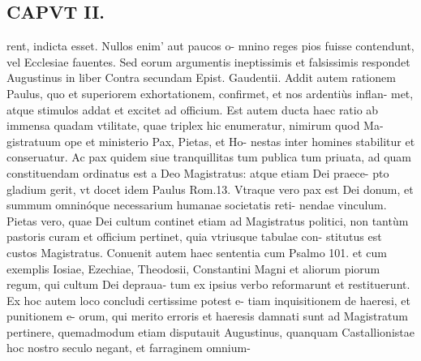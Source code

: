 \documentclass{article}
\begin{document}
\begin{pages}
\section*{CAPVT II. }
\marginpar{[ p.49 ]}\pstart rent, indicta esset. Nullos enim' aut paucos o- mnino reges pios fuisse contendunt, vel Ecclesiae fauentes. Sed eorum argumentis ineptissimis et falsissimis respondet Augustinus in liber  Contra secundam Epist. Gaudentii.  \pend\pstart Addit autem rationem Paulus, quo et superiorem exhortationem, confirmet, et nos ardentiùs inflan- met, atque  stimulos addat et excitet ad officium. Est autem ducta haec ratio ab immensa quadam vtilitate, quae triplex hic enumeratur, nimirum quod Ma- gistratuum ope et ministerio Pax, Pietas, et Ho- nestas inter homines stabilitur et conseruatur.  \pend\pstart Ac pax quidem siue tranquillitas tum publica tum priuata, ad quam constituendam ordinatus est a Deo Magistratus: atque etiam Dei praece- pto gladium gerit, vt docet idem Paulus Rom.13. Vtraque vero pax est Dei donum, et summum omninóque necessarium humanae societatis reti- nendae vinculum.  \pend\pstart Pietas vero, quae Dei cultum continet etiam ad Magistratus politici, non tantùm pastoris curam et officium pertinet, quia vtriusque tabulae con- stitutus est custos Magistratus. Conuenit autem haec sententia cum Psalmo 101. et cum exemplis Iosiae, Ezechiae, Theodosii, Constantini Magni et aliorum piorum regum, qui cultum Dei depraua- tum ex ipsius verbo reformarunt et restituerunt. Ex hoc autem loco concludi certissime potest e- tiam inquisitionem de haeresi, et punitionem e- orum, qui merito erroris et haeresis damnati sunt ad Magistratum pertinere, quemadmodum etiam disputauit Augustinus, quanquam Castallionistae hoc nostro seculo negant, et farraginem omnium-  \pend

\end{pages}
\end{document}
